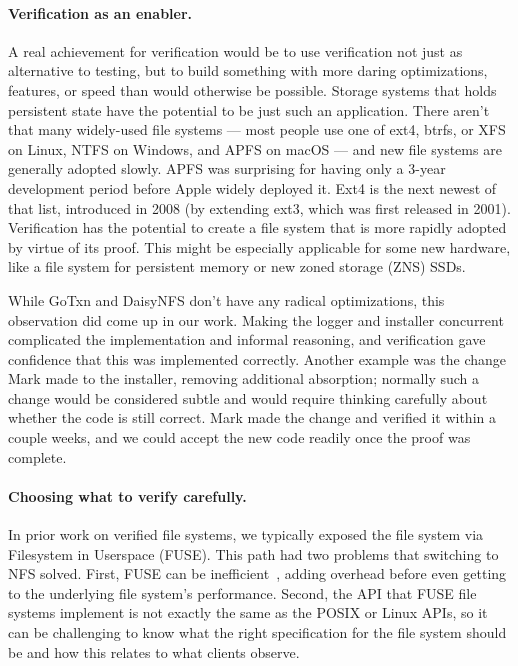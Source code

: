 \paragraph{Verification as an enabler.}
A real achievement for verification would be to use verification not just as
alternative to testing, but to build something with more daring optimizations,
features, or speed than would otherwise be possible. Storage systems that holds persistent
state have the potential to be just such an application. There aren't that many
widely-used
file systems --- most people use one of ext4, btrfs, or XFS on Linux, NTFS on
Windows, and APFS on macOS --- and new file systems are generally adopted
slowly. APFS was surprising for having only a 3-year development period before
Apple widely deployed it. Ext4 is the next newest of that list, introduced in
2008 (by extending ext3, which was first released in 2001). Verification has the
potential to create a file system that is more rapidly adopted by virtue of its
proof. This might be especially applicable for some new hardware, like a file
system for persistent memory or new zoned storage (ZNS) SSDs.


While GoTxn and DaisyNFS don't have any radical optimizations, this observation
did come up in our work. Making the logger and installer concurrent complicated
the implementation and informal reasoning, and verification gave confidence that this was implemented correctly.
Another example was the change Mark made to the installer, removing additional
absorption; normally such a change would be considered subtle and would require
thinking carefully about whether the code is still
correct. Mark made the change and verified it within a couple weeks, and we
could accept the new code readily once the proof was complete.

\paragraph{Choosing what to verify carefully.}
In prior work on verified file systems, we typically exposed the file system via
Filesystem in Userspace (FUSE). This path had two problems that switching to
NFS solved. First, FUSE can be inefficient~\cite{vangoor:fuse}, adding overhead
before even getting to the underlying file system's performance. Second, the API
that FUSE file systems implement is not exactly the same as the POSIX or Linux
APIs, so it can be challenging to know what the right specification for the file
system should be and how this relates to what clients observe.

